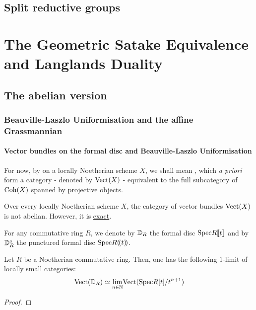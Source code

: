         \subsection{Split reductive groups}
        
    \section{The Geometric Satake Equivalence and Langlands Duality}
        \subsection{The abelian version}
            \subsubsection{Beauville-Laszlo Uniformisation and the affine Grassmannian}
                \paragraph{Vector bundles on the formal disc and Beauville-Laszlo Uniformisation}
                    \begin{convention}
                        For now, by  on a locally Noetherian scheme $X$, we shall mean , which \textit{a priori} form a category - denoted by $\mathrm{Vect}(X)$ - equivalent to the full subcategory of $\mathrm{Coh}(X)$ spanned by projective objects. 
                    \end{convention}
                    \begin{remark}
                        Over every locally Noetherian scheme $X$, the category of vector bundles $\mathrm{Vect}(X)$ is not abelian. However, it is \href{https://ncatlab.org/nlab/show/exact+category}{\underline{exact}}.
                    \end{remark}
                    
                    \begin{convention}
                        For any commutative ring $R$, we denote by $\mathbb{D}_R$ the formal disc $\mathrm{Spec} R[\![t]\!]$ and by $\mathbb{D}_R^{\circ}$ the punctured formal disc $\mathrm{Spec} R(\!(t)\!)$.
                    \end{convention}
                    
                    \begin{lemma} \label{lemma: vector_bundles_on_the_formal_disc}
                        Let $R$ be a Noetherian commutative ring. Then, one has the following $1$-limit of locally small categories:
                            $$\mathrm{Vect}(\mathbb{D}_R) \simeq \underset{n \in \mathbb{N}}{\operatorname{lim}} \mathrm{Vect}(\mathrm{Spec} R[t]/t^{n + 1})$$
                    \end{lemma}
                        \begin{proof}
                            
                        \end{proof}
                
